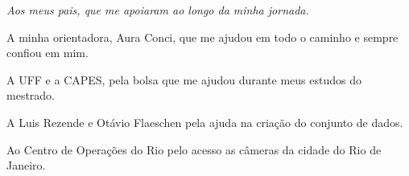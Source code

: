 \begin{flushright}
{\em 
    Aos meus pais, que me apoiaram ao longo da minha jornada.
}
\end{flushright}
\newpage


\hspace{5mm}
A minha orientadora, Aura Conci, que me ajudou em todo o caminho e sempre confiou em mim.

A UFF e a CAPES, pela bolsa que me ajudou durante meus estudos do mestrado.

A Luis Rezende e Otávio Flaeschen pela ajuda na criação do conjunto de dados.

Ao Centro de Operações do Rio pelo acesso as câmeras da cidade do Rio de Janeiro.

